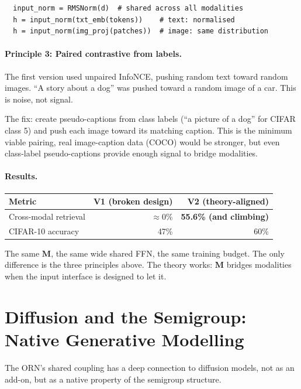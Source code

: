 \documentclass[11pt, a4paper]{article}
\newcommand{\M}{\mathbf{M}}
\theoremstyle{remark}
\begin{document}
\begin{verbatim}
  input_norm = RMSNorm(d)  # shared across all modalities
  h = input_norm(txt_emb(tokens))    # text: normalised
  h = input_norm(img_proj(patches))  # image: same distribution
\end{verbatim}

\paragraph{Principle 3: Paired contrastive from labels.}
The first version used unpaired InfoNCE, pushing random text toward random images.
``A story about a dog'' was pushed toward a random image of a car.
This is noise, not signal.

The fix: create pseudo-captions from class labels (``a picture of a dog'' for CIFAR class 5) and push each image toward its matching caption.
This is the minimum viable pairing, real image-caption data (COCO) would be stronger, but even class-label pseudo-captions provide enough signal to bridge modalities.

\paragraph{Results.}
\begin{center}\small
\begin{tabular}{@{}lrr@{}}
\toprule
Metric & V1 (broken design) & V2 (theory-aligned) \\
\midrule
Cross-modal retrieval & $\approx 0\%$ & \textbf{55.6\% (and climbing)} \\
CIFAR-10 accuracy & 47\% & 60\% \\
\bottomrule
\end{tabular}
\end{center}

The same $\M$, the same wide shared FFN, the same training budget.
The only difference is the three principles above.
The theory works: $\M$ bridges modalities when the input interface is designed to let it.

\section{Diffusion and the Semigroup: Native Generative Modelling}
\label{sec:diffusion}

The ORN's shared coupling has a deep connection to diffusion models, not as an add-on, but as a native property of the semigroup structure.
\end{document}
